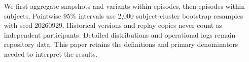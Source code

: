 We first aggregate snapshots and variants within episodes, then episodes within
subjects. Pointwise 95\% intervals use 2,000 subject-cluster bootstrap resamples
with seed 20260929. Historical versions and replay copies never count as
independent participants. Detailed distributions and operational logs remain
repository data. This paper retains the definitions and primary denominators
needed to interpret the results.
